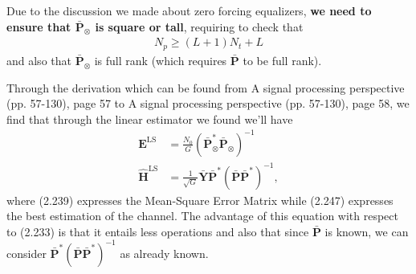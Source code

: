 \documentclass[a4paper, 12pt]{book}
\begin{document}
\vspace{1em}

Due to the discussion we made about zero forcing equalizers, \textbf{we need to ensure that $\bar{\boldsymbol{P}}_{\otimes}$ is square or tall}, requiring to check that
\begin{align}
N_p \ge (L+1)N_t + L \tag{2.234}
\end{align}
and also that $\bar{\boldsymbol{P}}_{\otimes}$ is full rank (which requires $\bar{\boldsymbol{P}}$ to be full rank).

\noindent\color{purple}\color{black}

Through the derivation which can be found from A signal processing perspective (pp. 57-130), page 57 to A signal processing perspective (pp. 57-130), page 58, we find that through the linear estimator we found we'll have
\begin{align}
\boldsymbol{E}^{\text{LS}} &= \frac{N_0}{G}(\bar{\boldsymbol{P}}_{\otimes}^*\bar{\boldsymbol{P}}_{\otimes})^{-1} \tag{2.239} \\
\hat{\boldsymbol{H}}^{\text{LS}} &= \frac{1}{\sqrt{G}}\bar{\boldsymbol{Y}}\bar{\boldsymbol{P}}^*(\bar{\boldsymbol{P}}\bar{\boldsymbol{P}}^*)^{-1}, \tag{2.247}
\end{align}
where (2.239) expresses the Mean-Square Error Matrix while (2.247) expresses the best estimation of the channel.
The advantage of this equation with respect to (2.233) is that it entails less operations and also that since $\bar{\boldsymbol{P}}$ is known, we can consider $\bar{\boldsymbol{P}}^*(\bar{\boldsymbol{P}}\bar{\boldsymbol{P}}^*)^{-1}$ as already known.

\noindent\color{purple}\color{black}
\end{document}
